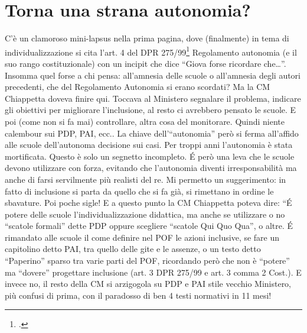\section*{Torna una strana autonomia?}
C'è un clamoroso mini-lapsus nella prima pagina, dove (finalmente) in tema di individualizzazione si cita l'art. 4 del DPR 275/99\footcite{DPR_275_1999} Regolamento autonomia (e il suo rango costituzionale) con un incipit che dice “Giova forse ricordare che…”. Insomma quel forse a chi pensa: all'amnesia delle scuole o all'amnesia degli autori precedenti, che del Regolamento Autonomia si erano scordati?
Ma la CM Chiappetta doveva finire qui. Toccava al Ministero segnalare il problema, indicare gli obiettivi per migliorare l'inclusione, al resto ci avrebbero pensato le scuole. E poi (come non si fa mai) controllare, altra cosa del monitorare. Quindi niente calembour sui PDP, PAI, ecc..
La chiave dell’“autonomia” però si ferma all'affido alle scuole dell'autonoma decisione sui casi.
Per troppi anni l'autonomia è stata mortificata. Questo è solo un segnetto incompleto. \'{E} però una leva che le scuole devono utilizzare con forza, evitando che l'autonomia diventi irresponsabilità ma anche di farsi servilmente più realisti del re. Mi permetto un suggerimento: in fatto di inclusione si parta da quello che si fa già, si rimettano in ordine le sbavature. Poi poche sigle!
E a questo punto la CM Chiappetta poteva dire: “\'{E} potere delle scuole l'individualizzazione  didattica, ma anche se utilizzare o no  “scatole formali” dette PDP oppure scegliere “scatole Qui Quo Qua”, o altre. \'{E} rimandato alle scuole il come definire nel POF le azioni inclusive, se fare un capitolino detto PAI, tra  quello delle gite e le assenze, o un testo detto “Paperino” sparso tra varie parti del POF, ricordando però che non è “potere” ma “dovere” progettare inclusione (art. 3 DPR 275/99 e art. 3 comma 2 Cost.).  E invece no, il resto della CM si arzigogola su PDP e PAI stile  vecchio Ministero, più confusi di prima, con il paradosso di ben 4 testi normativi in 11 mesi!
